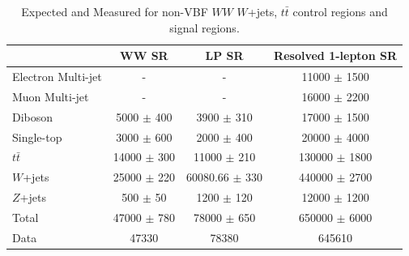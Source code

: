 \begin{table}
\begin{tabular}{|l|c|c|c|}
\hline
	  &	 WW SR &	 LP SR &	Resolved 1-lepton SR \\\hline 
	Electron Multi-jet &	- &	- &	11000 $\pm$ 1500 \\\hline 
	Muon Multi-jet &	- &	- &	16000 $\pm$ 2200 \\\hline 
	Diboson &	5000 $\pm$ 400 &	3900 $\pm$ 310 &	17000 $\pm$ 1500 \\\hline 
	Single-top &	3000 $\pm$ 600 &	2000 $\pm$ 400 &	20000 $\pm$ 4000 \\\hline 
	$t\bar{t}$ &	14000 $\pm$ 300 &	11000 $\pm$ 210&	130000 $\pm$ 1800 \\\hline 
	$W$+jets &	25000 $\pm$ 220 &	60080.66 $\pm$ 330 &	440000 $\pm$ 2700 \\\hline 
	$Z$+jets &	500 $\pm$ 50 &	1200 $\pm$ 120 &	12000 $\pm$ 1200 \\\hline 
	Total &	47000 $\pm$ 780 &	78000 $\pm$ 650 &	650000 $\pm$ 6000 \\\hline 
	Data &	47330 &	78380 &	645610 \\\hline 
\end{tabular}
\caption{Expected and Measured for non-VBF $WW$ $W$+jets, $t\bar{t}$ control regions and signal regions.}
\label{tbl:hvtww_yields}
\end{table}

